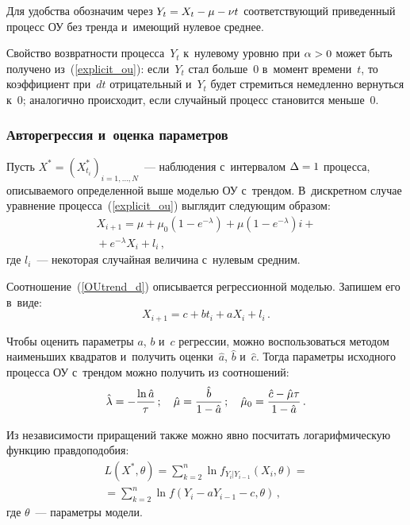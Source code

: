 \begin{multicols}{2}
Для удобства обозначим через $Y_t\hm = X_t \hm-\mu\hm- \nu t$ соответствующий приведенный 
процесс ОУ без тренда и~имеющий нулевое среднее.

Свойство возвратности  процесса~$Y_t$ к~нулевому уровню  при $\alpha \hm> 0$ может 
быть получено из~(\ref{explicit_ou}):  если~$Y_t$ стал больше~0 в~момент 
времени~$t$, то коэффициент при~$dt$ отрицательный и~$Y_t$ будет стремиться 
немедленно вернуться к~0; аналогично происходит, если случайный процесс 
становится меньше~0.

\subsubsection{Авторегрессия и~оценка параметров}

Пусть $ X ^ * = {\left(X^*_{t_i}\right)}_ {i = 1, \ldots, N} $~--- 
наблюдения с~интервалом 
$\Delta \hm=  1$ процесса, описываемого определенной выше моделью ОУ с~трендом. 
В~дискретном случае уравнение процесса~(\ref{explicit_ou}) выглядит следующим 
образом:
        \begin{multline}
         \label{OUtrend_d}
        X_{i+1} = \mu + \mu_0\left(1 - e^{-\lambda}\right) + 
        \mu \left(1 - e^{-\lambda}\right)i+ {}\\
        {}+e^{-\lambda } X_{i} + l_i\,,
        \end{multline}
        где $l_i $~--- некоторая случайная величина с~нулевым средним.

        Соотношение~(\ref{OUtrend_d}) описывается регрессионной моделью. Запишем 
его в~виде:
        \begin{equation*} 
        X_{i+1} = c + b t_i + a X_{i} + l_i\,.
        \end{equation*}

        Чтобы оценить параметры $a$, $b$ и~$c$ регрессии, можно воспользоваться 
методом наименьших квад\-ра\-тов и~получить оценки~$\hat{a}$, $\hat{b}$ и~$\hat{c}.$ 
Тогда параметры исходного процесса ОУ с~трендом можно получить 
из соотношений:
        \begin{equation*}
                \hat{\lambda} = -\displaystyle\frac{\displaystyle \ln\hat{a}\mathstrut}{\displaystyle \tau\mathstrut}\,;\quad
                \hat{\mu} = \displaystyle\frac{\displaystyle \hat{b}\mathstrut}{\displaystyle 1-\hat{a}\mathstrut}\,; \quad
                \hat{\mu}_0 = \displaystyle\frac{\displaystyle \hat{c} - \hat{\mu} \tau\mathstrut}{\displaystyle 1 - \hat{a}\mathstrut}\,.
        \end{equation*}

        Из независимости приращений также можно явно посчитать логарифмическую 
функцию правдоподобия: 
\begin{multline*}
L\left(X^*, \theta\right) =  \sum\limits_{k = 2}^n \ln 
f_{Y_i |Y_{i -1}}(X_i , \theta) = {}\\
{}=  \sum\limits_{k = 2}^n \ln 
f\left(Y_i - a Y_{i - 1} - c,\theta\right)\,,
\end{multline*}
где $\theta$~--- параметры модели.


\end{multicols}
